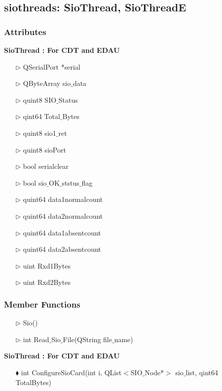 \begin{enumerate}
\subsection{siothreads: SioThread, SioThreadE}



\subsubsection{Attributes}

\textbf{SioThread : For CDT and EDAU}\\
\begin{enumerate}
	\item [$\rhd$] QSerialPort *serial	
	\item [$\rhd$] QByteArray sio$\_$data
	\item [$\rhd$] quint8 SIO$\_$Status
	\item [$\rhd$] qint64 Total$\_$Bytes
	\item [$\rhd$] quint8 sio1$\_$ret
	\item [$\rhd$] quint8 sioPort
	\item [$\rhd$] bool serialclear
	\item [$\rhd$] bool sio$\_$OK$\_$ststus$\_$flag
	\item [$\rhd$] quint64 data1normalcount
	\item [$\rhd$] quint64 data2normalcount
	\item [$\rhd$] quint64 data1absentcount
	\item [$\rhd$] quint64 data2absentcount
	\item [$\rhd$] uint Rxd1Bytes
	\item [$\rhd$] uint Rxd2Bytes
\end{enumerate}

\subsubsection{Member Functions } 
\begin{enumerate}
	\item [$\rhd$] Sio()
	\item [$\rhd$] int Read$\_$Sio$\_$File(QString file$\_$name)
\end{enumerate}
\textbf{SioThread : For CDT and EDAU}\\
\begin{enumerate}
	\item [$\blacklozenge$] int ConfigureSioCard(int i, QList$<$SIO$\_$Node*$>$ sio$\_$list, qint64 TotalBytes)
\end{enumerate}

\end{enumerate}

